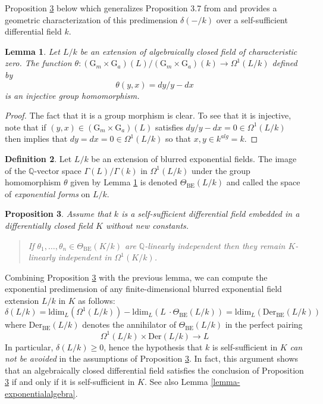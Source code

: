 \documentclass[12pt]{amsart}
\newcommand{\BE}{\mathrm{BE}}
\theoremstyle{definition}
\newtheorem{defn}{Definition}[section]
\theoremstyle{plain}
\newtheorem{Prop}[defn]{Proposition}
\newtheorem{lem}[defn]{Lemma}
\theoremstyle{exampstyle}\newtheorem{thmx}{Theorem}
\theoremstyle{exampstyle}\newtheorem{thmxbis}{Theorem}
\begin{document}
Proposition \ref{proposition-predimension} below which generalizes Proposition 3.7 from \cite{Kirby-semiab} and provides a geometric characterization of this predimension $\delta(-/k)$ over a self-sufficient differential field $k$. 


\begin{lem} \label{lemma-theta-definition}
Let $L/k$  be an extension of algebraically closed field of characteristic zero. The function $\theta : ( \mathrm{G}_m \times \mathrm{G}_a)(L) /(\mathrm{G}_m \times \mathrm{G}_a)(k) \rightarrow \Omega^1(L/k)$ defined by $$\theta(y,x) = dy/y - dx$$is an injective group homomorphism.
\end{lem}

\begin{proof} 
The fact that it is a group morphism is clear. To see that it is injective, note that if $(y,x) \in (\mathrm{G}_m \times \mathrm{G}_a)(L)$ satisfies $dy/y - dx = 0 \in \Omega^1(L/k)$ then  \citep[Proposition 4]{Rosenlicht} implies that $dy = dx = 0 \in \Omega^1(L/k)$ so that $x,y \in k^{alg} = k$.
\end{proof}


\begin{defn}
Let $L/k$ be an extension of blurred exponential fields. The image of the $\mathbb{Q}$-vector space $\Gamma(L)/\Gamma(k)$ in $\Omega^1(L/k)$ under the group homomorphism $\theta$ given by Lemma \ref{lemma-theta-definition} is denoted $\Theta_{\BE}(L/k)$ and called the space of {\em exponential forms} on $L/k$.
\end{defn}




\begin{Prop} \label{proposition-predimension}
Assume that $k$ is a {\em self-sufficient} differential field embedded in a differentially closed field $K$ without new constants. 

\begin{quote} If $\theta_1,\ldots, \theta_n \in \Theta_{\BE}(K/k)$ are $\mathbb{Q}$-linearly independent then they remain $K$-linearly independent in $\Omega^1(K/k)$.
\end{quote}
\end{Prop}

Combining  Proposition \ref{proposition-predimension} with the previous lemma, we can compute the exponential predimension of any finite-dimensional blurred exponential field extension $L/k$ in $K$ as follows: 
$$ \delta(L/k) = \mathrm{ldim}_L(\Omega^1(L/k)) - \mathrm{ldim}_L (L \ \cdot \Theta_{\BE}(L/k)) = \mathrm{ldim}_L(\mathrm{Der}_{\BE}(L/k))$$
where $\mathrm{Der}_{\BE}(L/k)$ denotes the annihilator of $\Theta_{\BE}(L/k)$ in the perfect pairing 
$$ \Omega^1(L/k) \times \mathrm{Der}(L/k) \rightarrow L $$
In particular, $\delta(L/k) \geq 0$, hence the hypothesis that $k$ is self-sufficient in $K$ \textit{can not be avoided} in the assumptions of Proposition \ref{proposition-predimension}. In fact, this argument shows that an algebraically closed differential field satisfies the conclusion of Proposition \ref{proposition-predimension} if and only if it is self-sufficient in $K$. See also Lemma \ref{lemma-exponentialalgebra}.
\end{document}
